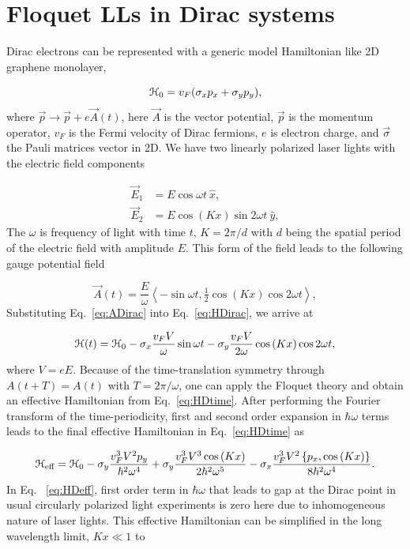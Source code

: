 \section{Floquet LLs in Dirac systems}
Dirac electrons can be represented with a generic model Hamiltonian like 2D graphene monolayer,

\begin{equation}\label{eq:HDirac}
	\mathcal{H}_0 =v_F(\sigma _{x}p_{x}+\sigma _{y}p_{y}),
\end{equation}%
where $\vec{p} \rightarrow \vec{p}+e\vec{A}(t)$, here $\vec{A}$ is the vector
potential, $\vec{p}$ is the momentum operator, $v_F$ is the Fermi
velocity of Dirac fermions, $e$ is electron charge,
and $\vec{\sigma}$ the Pauli matrices vector in 2D.
We have two linearly polarized laser lights with the electric field components

\begin{align} \label{eq:EDfield}
\vec{E}_{1} &= E\cos \omega t\ \hat{x}, \nonumber \\
\vec{E}_{2} &= E\cos(Kx)\sin 2\omega t\ \hat{y},
\end{align}
The $\omega $ is frequency of light with time $t$, $K=2\pi /d$ with $d$ being the spatial period of the electric field with
amplitude $E$.
This form of the field leads to the following gauge potential field

\begin{equation}\label{eq:ADirac}
  \vec{A}(t)= \dfrac{E}{\omega} \left\langle -\sin \omega t, \tfrac{1}{2}\cos(Kx) \cos 2\omega t \right\rangle,
\end{equation}%
Substituting Eq.~\eqref{eq:ADirac} into Eq.~\eqref{eq:HDirac}, we arrive at%

\begin{equation}\label{eq:HDtime}
  \mathcal{H}(t)=\mathcal{H}_{0} - \sigma _{x} \dfrac{v_F V}{\omega} \sin {\omega t} - \sigma _{y} \dfrac{v_F V}{2\omega}\cos{(Kx)} \cos2\omega t,
\end{equation}%
where $V = eE$.
Because of the time-translation symmetry through $A(t+T)=A(t)$ with $T=2\pi /\omega $, one can apply the Floquet theory \cite{AEE, MBL, supp} and obtain an effective Hamiltonian from Eq.~\eqref{eq:HDtime}.
After performing the Fourier transform of the time-periodicity, first and second order expansion in $\hbar\omega$ terms leads to the final effective Hamiltonian in Eq.~\eqref{eq:HDtime} as

\begin{equation} \label{eq:HDeff}
  \mathcal{H}_{\text{eff}}=\mathcal{H}_{0}-\sigma_y\frac{v_F^3 V^2 p_y}{\hbar^{2}\omega^{4}}
  +\sigma_y\frac{v_F^3 V^{3}\cos{(Kx)}}{2\hbar^{2}\omega^{5}}
  -\sigma_x\frac{v_F^3 V^2 \left\{p_x, \cos{(Kx)} \right\} }{8\hbar^{2}\omega^{4}}.
\end{equation}
In Eq. ~\eqref{eq:HDeff}, first order term in $\hbar \omega$ that leads to gap at the Dirac point in usual circularly polarized light experiments \cite{YHW, JWM} is zero here due to inhomogeneous nature of laser lights.
This effective Hamiltonian can be simplified in the long wavelength limit, $Kx \ll 1$ to

